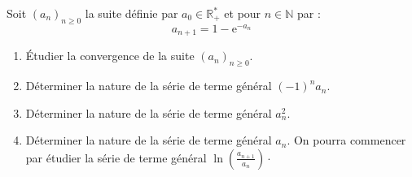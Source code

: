 \documentclass[a4paper,twoside,french,10pt]{VcCours}
\begin{document}
\medskip



\begin{Exercice}{} Soit $(a_n )_{n \geq 0} $ la suite définie par $a_0  \in \mathbb{R}^{*}_+$ et pour $n \in \mathbb{N}$ par :
$$a_{n + 1}  = 1 - {\mathrm{e}}^{ - a_n } $$
\begin{enumerate}
	\item Étudier la convergence de la suite $(a_n )_{n \geq 0}$.
	
\item Déterminer la nature de la série de terme général $( - 1)^n a_n.$
	
	\item Déterminer la nature de la série de terme général $a_n^2 $.
	
	\item  Déterminer la nature de la série de terme général $a_n $. On pourra commencer par étudier la série de terme général $\ln \left( {\frac{{a_{n + 1} }}{{a_n }}} \right) \cdot$
\end{enumerate}
\end{Exercice}
\end{document}
